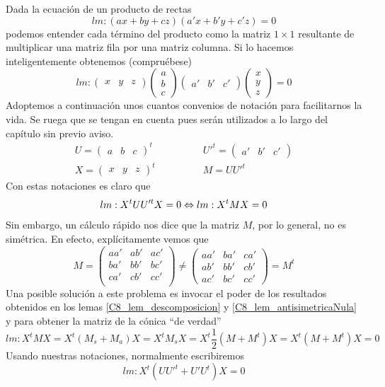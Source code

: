 Dada la ecuación de un producto de rectas
\[lm:(ax+by+cz)(a'x+b'y+c'z)=0\]
podemos entender cada término del producto como la matriz $1\times 1$ resultante de multiplicar una matriz fila por una matriz columna. Si lo hacemos inteligentemente obtenemos (compruébese)
\[lm:\begin{pmatrix}
x & y & z
\end{pmatrix}\begin{pmatrix}
a\\
b\\
c
\end{pmatrix}
\begin{pmatrix}
a' & b' & c'
\end{pmatrix}\begin{pmatrix}
x\\
y\\
z
\end{pmatrix}=0\]
Adoptemos a continuación unos cuantos convenios de notación para facilitarnos la vida. Se ruega que se tengan en cuenta pues serán utilizados a lo largo del capítulo sin previo aviso.
\[\begin{array}{cc}
U=\begin{pmatrix}
a & b & c
\end{pmatrix}^t\qquad&\qquad U'^t=\begin{pmatrix}
a' & b' & c'
\end{pmatrix}\\
X=\begin{pmatrix}
x & y & z
\end{pmatrix}^t\qquad &  \qquad M=UU'^t\end{array}\]
Con estas notaciones es claro que \[lm:X^tUU'^tX=0\Leftrightarrow lm:X^tMX=0\]
Sin embargo, un cálculo rápido nos dice que la matriz $M$, por lo general, no es simétrica. En efecto, explícitamente vemos que
\[M=\begin{pmatrix}
aa' & ab' & ac'\\
ba' & bb' & bc'\\
ca' & cb' & cc'\\
\end{pmatrix}\not=\begin{pmatrix}
aa' & ba' & ca'\\
ab' & bb' & cb'\\
ac' & bc' & cc'
\end{pmatrix}=M^t\]
Una posible solución a este problema es invocar el poder de los resultados obtenidos en los lemas \ref{C8_lem_descomposicion} y \ref{C8_lem_antisimetricaNula} y para obtener la matriz de la cónica ``de verdad''
\begin{equation*}lm:X^tMX=X^t(M_s+M_a)X=X^tM_sX=X^t\frac{1}{2}(M+M^t)X=X^t(M+M^t)X=0\end{equation*}
Usando nuestras notaciones, normalmente escribiremos
\begin{equation}
	lm:X^t(UU'^t+U'U^t)X=0
\end{equation}

